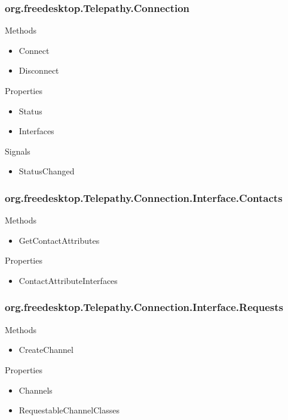 \documentclass{beamer}
\begin{document}
\begin{frame}[fragile]
    \frametitle{org.freedesktop.Telepathy.Connection}

    \begin{block}{Methods}
    \begin{itemize}
    \item Connect
    \item Disconnect
    \end{itemize}
    \end{block}

    \begin{block}{Properties}
    \begin{itemize}
    \item Status
    \item Interfaces
    \end{itemize}
    \end{block}

    \begin{block}{Signals}
    \begin{itemize}
    \item StatusChanged
    \end{itemize}
    \end{block}
\end{frame}

\begin{frame}[fragile]
    \frametitle{org.freedesktop.Telepathy.Connection.Interface.Contacts}

    \begin{block}{Methods}
    \begin{itemize}
    \item GetContactAttributes
    \end{itemize}
    \end{block}

    \begin{block}{Properties}
    \begin{itemize}
    \item ContactAttributeInterfaces
    \end{itemize}
    \end{block}
\end{frame}

\begin{frame}[fragile]
    \frametitle{org.freedesktop.Telepathy.Connection.Interface.Requests}

    \begin{block}{Methods}
    \begin{itemize}
    \item CreateChannel
    \end{itemize}
    \end{block}

    \begin{block}{Properties}
    \begin{itemize}
    \item Channels
    \item RequestableChannelClasses
    \end{itemize}
    \end{block}
\end{frame}
\end{document}
